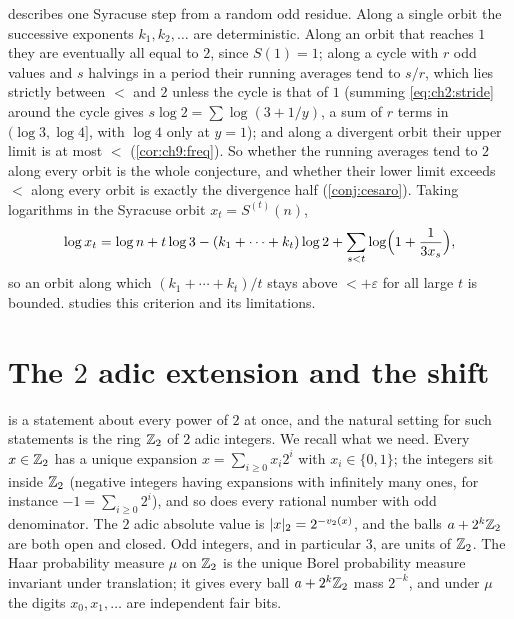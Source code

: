 \begin{remark}\label{rem:ch2:notorbit}
 describes one Syracuse step from a random odd residue. Along
a single orbit the successive exponents $k_1,k_2,\ldots$ are deterministic.
Along an orbit that reaches $1$ they are eventually all equal to $2$, since $S(1)=1$; along a cycle with $r$ odd values and $s$ halvings in a period their running averages tend to $s/r$, which lies strictly between $\lt$ and $2$ unless the cycle is that of $1$ (summing \eqref{eq:ch2:stride} around the cycle gives $s\log2=\sum\log(3+1/y)$, a sum of $r$ terms in $(\log3,\log4]$, with $\log4$ only at $y=1$); and along a divergent orbit their upper limit is at most $\lt$ (\cref{cor:ch9:freq}).
So whether the running averages tend to $2$ along every orbit is the whole conjecture, and whether their lower limit exceeds $\lt$ along every orbit is exactly the divergence half (\cref{conj:cesaro}).
Taking logarithms in the
Syracuse orbit $x_t=S^{(t)}(n)$,
\[
  \log x_t=\log n+t\log3-(k_1+\cdots+k_t)\log2+\sum_{s<t}\log\Bigl(1+\frac1{3x_s}\Bigr),
\]
so an orbit along which $(k_1+\cdots+k_t)/t$ stays above $\lt+\varepsilon$ for
all large $t$ is bounded.  studies this criterion and
its limitations.
\end{remark}

\section{The $2$ adic extension and the shift}\label{sec:ch2:adic}

 is a statement about every power of $2$ at once, and the
natural setting for such statements is the ring $\mathbb{Z}_2$ of $2$ adic integers.
We recall what we need. Every $x\in\mathbb{Z}_2$ has a unique expansion
$x=\sum_{i\geq0}x_i2^i$ with $x_i\in\{0,1\}$; the integers sit inside $\mathbb{Z}_2$
(negative integers having expansions with infinitely many ones, for instance
$-1=\sum_{i\geq0}2^i$), and so does every rational number with odd
denominator. The $2$ adic absolute value is $|x|_2=2^{-v_2(x)}$, and the balls
$a+2^k\mathbb{Z}_2$ are both open and closed. Odd integers, and in particular $3$,
are units of $\mathbb{Z}_2$. The Haar probability measure $\mu$ on $\mathbb{Z}_2$ is the
unique Borel probability measure invariant under translation; it gives every
ball $a+2^k\mathbb{Z}_2$ mass $2^{-k}$, and under $\mu$ the digits $x_0,x_1,\ldots$
are independent fair bits.

